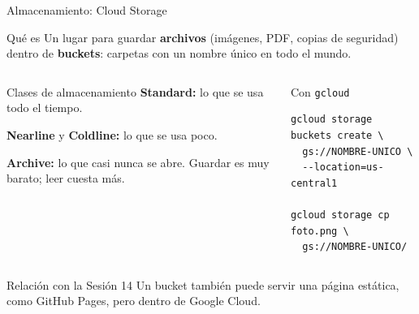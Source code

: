 \documentclass[aspectratio=169,10pt,c]{beamer}
\begin{document}
\begin{frame}[fragile]{Almacenamiento: Cloud Storage}
\begin{block}{Qué es}
\small Un lugar para guardar \textbf{archivos} (imágenes, PDF, copias de seguridad) dentro de \textbf{buckets}: carpetas con un nombre único en todo el mundo.
\end{block}
\begin{columns}[T,onlytextwidth]
\begin{exampleblock}{Clases de almacenamiento}
\small
\textbf{Standard:} lo que se usa todo el tiempo.\par\smallskip
\textbf{Nearline} y \textbf{Coldline:} lo que se usa poco.\par\smallskip
\textbf{Archive:} lo que casi nunca se abre. Guardar es muy barato; leer cuesta más.
\end{exampleblock}
\begin{block}{Con \texttt{gcloud}}
\begin{lstlisting}[basicstyle=\ttfamily\footnotesize]
gcloud storage buckets create \
  gs://NOMBRE-UNICO \
  --location=us-central1

gcloud storage cp foto.png \
  gs://NOMBRE-UNICO/
\end{lstlisting}
\end{block}
\end{columns}
\par\vspace{1mm}
\begin{alertblock}{Relación con la Sesión 14}
\small Un bucket también puede servir una página estática, como GitHub Pages, pero dentro de Google Cloud.
\end{alertblock}
\end{frame}
\end{document}
